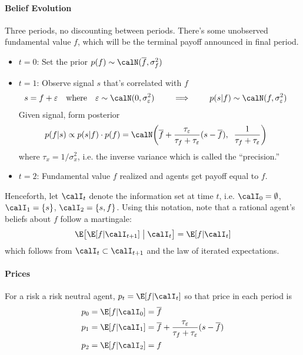 \documentclass[12pt]{article}
\theoremstyle{plain}
\theoremstyle{definition}
\theoremstyle{remark}
\begin{document}
\paragraph{Belief Evolution}
Three periods, no discounting between periods.
There's some unobserved fundamental value $f$, which will be the
terminal payoff announced in final period.
\begin{itemize}
  \item $t=0$: Set the prior $p(f)\sim\calN(\overline{f},\sigma_f^2)$

  \item $t=1$: Observe signal $s$ that's correlated with $f$
    \begin{align*}
      s &= f + \varepsilon
      \quad
      \text{where}\quad
       \varepsilon\sim\calN(0, \sigma_\varepsilon^2)
      \qquad\implies\qquad
      p(s|f) \sim\calN(f, \sigma_\varepsilon^2)
    \end{align*}
    Given signal, form posterior
    \begin{align*}
      p(f|s)
      &\propto
      p(s|f)
      \cdot p(f)
      =
      \calN\bigg(
          \overline{f}
          + \frac{\tau_\varepsilon}{\tau_f+\tau_\varepsilon}
          (s-\overline{f})
        ,\;\;
        \frac{1}{\tau_f+\tau_\varepsilon}
      \bigg)
    \end{align*}
    where $\tau_x=1/\sigma^2_x$, i.e. the inverse variance which is
    called the ``precision.''

  \item $t=2$: Fundamental value $f$ realized and agents get payoff
    equal to $f$.
\end{itemize}
Henceforth, let $\calI_t$ denote the information set at time
$t$, i.e. $\calI_0=\emptyset$, $\calI_1=\{s\}$, $\calI_2=\{s,f\}$.
Using this notation, note that a rational agent's beliefs about $f$
follow a martingale:
\begin{align*}
  \E\big[ \E[f|\calI_{t+1}] \;\big|\;\calI_t\big]
  = \E[f|\calI_{t}]
\end{align*}
which follows from $\calI_t\subset \calI_{t+1}$ and the law of iterated
expectations.

\paragraph{Prices}
For a risk a risk neutral agent, $p_t = \E[f|\calI_t]$ so that price
in each period is
\begin{align*}
  p_0
  &=
  \E[f|\calI_0]
  =
  \overline{f}\\
  p_1
  &=
  \E[f|\calI_1]
  =
  \overline{f}
  + \frac{\tau_\varepsilon}{\tau_f+\tau_\varepsilon}
  (s-\overline{f})
  \\
  p_2
  &=
  \E[f|\calI_2]
  =
  f
\end{align*}
\end{document}
